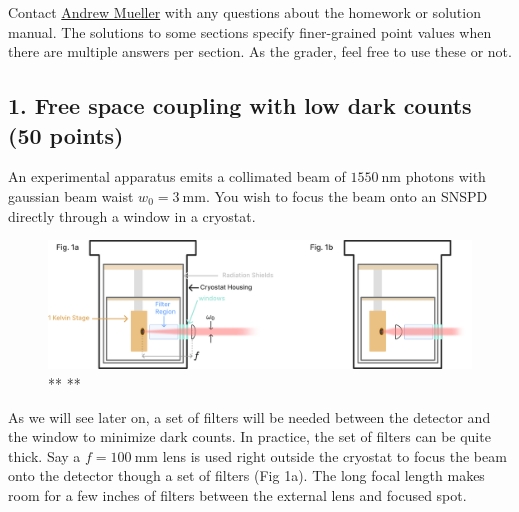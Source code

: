\documentclass[12pt]{caltech_thesis}
\begin{document}
{\color{midnightblue} Contact
\href{mailto:andrewstermueller@gmail.com}{Andrew Mueller} with any
questions about the homework or solution manual. The solutions to some
sections specify finer-grained point values when there are multiple
answers per section. As the grader, feel free to use these or not. }

\hypertarget{free-space-coupling-with-low-dark-counts-50-points}{%
\subsection{1. Free space coupling with low dark counts (50
points)}\label{free-space-coupling-with-low-dark-counts-50-points}}

An experimental apparatus emits a collimated beam of
\(1550~\mathrm{nm}\) photons with gaussian beam waist
\(w_0 = 3~\mathrm{mm}\). You wish to focus the beam onto an SNSPD
directly through a window in a cryostat.

\hypertarget{fig:cryostat_concept}{%
\begin{figure}
\centering
\includegraphics{chapter_05/figs_05/fig1b_light.pdf}
\caption[{Cryostat optical coupling}]{** **}
\label{fig:cryostat_concept}
\end{figure}
}

As we will see later on, a set of filters will be needed between the
detector and the window to minimize dark counts. In practice, the set of
filters can be quite thick. Say a \(f = 100~\mathrm{mm}\) lens is used
right outside the cryostat to focus the beam onto the detector though a
set of filters (Fig 1a). The long focal length makes room for a few
inches of filters between the external lens and focused spot.
\end{document}
